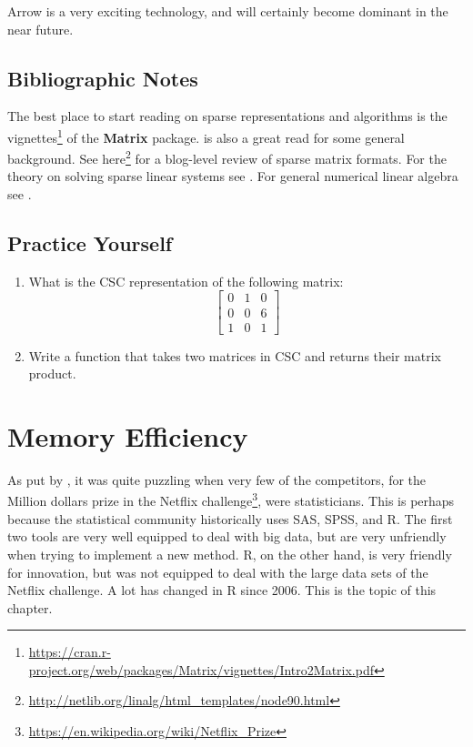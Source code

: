 \documentclass[]{book}
\renewcommand{\href}[2]{#2\footnote{\url{#1}}}
\theoremstyle{definition}
\theoremstyle{definition}
\theoremstyle{definition}
\theoremstyle{remark}
\begin{document}
Arrow is a very exciting technology, and will certainly become dominant in the near future.

\hypertarget{bibliographic-notes-12}{%
\section{Bibliographic Notes}\label{bibliographic-notes-12}}

The best place to start reading on sparse representations and algorithms is the \href{https://cran.r-project.org/web/packages/Matrix/vignettes/Intro2Matrix.pdf}{vignettes} of the \textbf{Matrix} package.
\citet{gilbert1992sparse} is also a great read for some general background.
See \href{http://netlib.org/linalg/html_templates/node90.html}{here} for a blog-level review of sparse matrix formats.
For the theory on solving sparse linear systems see \citet{davis2006direct}.
For general numerical linear algebra see \citet{gentle2012numerical}.

\hypertarget{practice-yourself-10}{%
\section{Practice Yourself}\label{practice-yourself-10}}

\begin{enumerate}
\def\labelenumi{\arabic{enumi}.}
\item
  What is the CSC representation of the following matrix:
  \[\begin{bmatrix}
  0 & 1 & 0 \\
  0 & 0 & 6 \\
  1 & 0 & 1 
  \end{bmatrix}\]
\item
  Write a function that takes two matrices in CSC and returns their matrix product.
\end{enumerate}

\hypertarget{memory}{%
\chapter{Memory Efficiency}\label{memory}}

As put by \citet{kane2013scalable}, it was quite puzzling when very few of the competitors, for the Million dollars prize in the \href{https://en.wikipedia.org/wiki/Netflix_Prize}{Netflix challenge}, were statisticians.
This is perhaps because the statistical community historically uses SAS, SPSS, and R.
The first two tools are very well equipped to deal with big data, but are very unfriendly when trying to implement a new method.
R, on the other hand, is very friendly for innovation, but was not equipped to deal with the large data sets of the Netflix challenge.
A lot has changed in R since 2006. This is the topic of this chapter.
\end{document}
